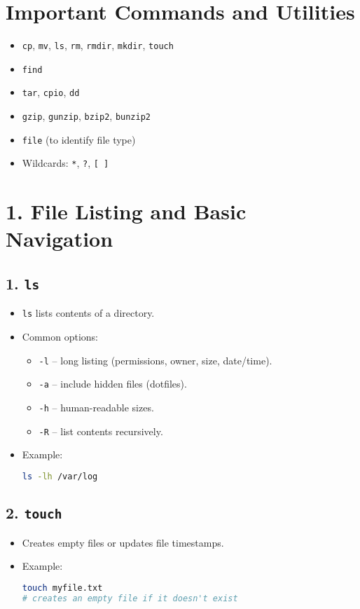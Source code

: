 \documentclass[a4paper]{report}
\begin{document}
\section*{Important Commands and Utilities}
\begin{itemize}
    \item \texttt{cp}, \texttt{mv}, \texttt{ls}, \texttt{rm}, \texttt{rmdir}, \texttt{mkdir}, \texttt{touch}
    \item \texttt{find}
    \item \texttt{tar}, \texttt{cpio}, \texttt{dd}
    \item \texttt{gzip}, \texttt{gunzip}, \texttt{bzip2}, \texttt{bunzip2}
    \item \texttt{file} (to identify file type)
    \item Wildcards: \texttt{*}, \texttt{?}, \texttt{[ ]}
\end{itemize}

\section*{1. File Listing and Basic Navigation}
\subsection*{1. \texttt{ls}}
\begin{itemize}
    \item \texttt{ls} lists contents of a directory.
    \item Common options:
    \begin{itemize}
        \item \texttt{-l} -- long listing (permissions, owner, size, date/time).
        \item \texttt{-a} -- include hidden files (dotfiles).
        \item \texttt{-h} -- human-readable sizes.
        \item \texttt{-R} -- list contents recursively.
    \end{itemize}
    \item Example:
\begin{lstlisting}[language=bash]
ls -lh /var/log
\end{lstlisting}
\end{itemize}

\subsection*{2. \texttt{touch}}
\begin{itemize}
    \item Creates empty files or updates file timestamps.
    \item Example:
\begin{lstlisting}[language=bash]
touch myfile.txt
# creates an empty file if it doesn't exist
\end{lstlisting}
\end{itemize}
\end{document}
